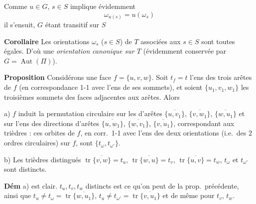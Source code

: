 \documentclass[11pt,a4paper]{article}
\begin{document}
Comme $u \in G$, $s \in S$ implique évidemment
\[
  \omega_{u(s)} = u(\omega_s)
\]
il s'ensuit, $G$ étant transitif sur $S$

\textbf{Corollaire} Les orientations $\omega_s$ ($s \in S$) de $T$
associées aux $s \in S$ sont toutes égales. D'où une \emph{orientation} \emph{canonique sur $T$}
(évidemment conservée par $G = \operatorname{Aut}(\Pi)$).


\textbf{Proposition} Considérons une face $f = \{u, v, w\}$.
 Soit $t_f = t$ l'ens des trois arêtes de
$f$ (en correspondance 1-1 avec l'ens de ses sommets), et soient $\{u_1,
v_1, w_1\}$ les troisièmes sommets des  faces 
adjacentes aux arêtes. Alors

a) $f$ induit la permutation circulaire \struck{\ill{}} sur les
 d'arêtes $\overline{\{u, v_1\}}$, $\overline{\{v,
w_1\}}$, $\overline{\{w, u_1\}}$ et sur l'ens des directions d'arêtes
$\overline{\{u, w_1\}}$, $\overline{\{w, v_1\}}$, $\overline{\{v, u_1\}}$,
correspondant  aux trièdres 
: ces orbites de $f$,
en corr.\ 1-1 avec l'ens des deux orientations  (i.e.\ des 2 ordres
circulaires) sur $f$, sont $\{t_\omega, t_{\omega'}\}$.


b) Les  trièdres distingués $\operatorname{tr}\overline{\{v, w\}} =
t_u$, $\operatorname{tr}
\overline{\{w, u\}} = t_v$, $\operatorname{tr}\overline{\{u, v\}} = t_w$,
$t_\omega$ et $t_{\omega'}$ sont distincts.

\textbf{Dém} a) est clair.  $t_u, t_v, t_w$ 
distincts est ce qu'on peut  de la prop.\ précédente, ainsi
que $t_u \neq t_\omega = \operatorname{tr}\overline{\{w, u_1\}}$, $t_u \neq
t_{\omega'} = \operatorname{tr}\overline{\{v, u_1\}}$ et de même pour
$t_v$, $t_w$.
\end{document}

